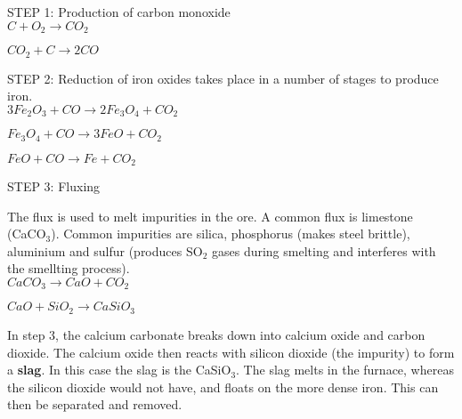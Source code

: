 \begin{center}

STEP 1: Production of carbon monoxide\\

\rm${C + O_{2} \rightarrow CO_{2}}$

\rm${CO_{2} + C \rightarrow 2CO}$
\end{center}

\begin{center}
STEP 2: Reduction of iron oxides takes place in a number of stages to produce iron.\\

\rm${3Fe_{2}O_{3} + CO \rightarrow 2Fe_{3}O_{4} + CO_{2}}$

\rm${Fe_{3}O_{4} + CO \rightarrow 3FeO + CO_{2}}$

\rm${FeO + CO \rightarrow Fe + CO_{2}}$
\end{center} 

\begin{center}
STEP 3: Fluxing

The flux is used to melt impurities in the ore. A common flux is limestone (CaCO$_{3}$). Common impurities are silica, phosphorus (makes steel brittle), aluminium and sulfur (produces SO$_{2}$ gases during smelting and interferes with the smellting process).\\


\rm${CaCO_{3} \rightarrow CaO + CO_{2}}$

\rm${CaO + SiO_{2} \rightarrow CaSiO_{3}}$
\end{center}

In step 3, the calcium carbonate breaks down into calcium oxide and carbon dioxide. The calcium oxide then reacts with silicon dioxide (the impurity) to form a \textbf{slag}. In this case the slag is the CaSiO$_{3}$. The slag melts in the furnace, whereas the silicon dioxide would not have, and floats on the more dense iron. This can then be separated and removed.

